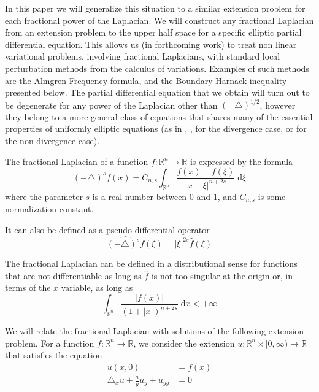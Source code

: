 \documentclass[letterpaper]{article}
\numberwithin{equation}{section}
\newcommand{\abs}[1]{\left\vert#1\right\vert}
\newcommand{\R}{\mathbb R}
\newcommand{\lap} {\triangle}
\newcommand{\dd} {\; \mathrm{d}}
\newcommand{\Ly}[1]{\lap_x #1 + \frac{a}{y} #1_y + #1_{yy}}
\begin{document}
In this paper we will generalize this situation to a similar extension problem for each fractional power of the Laplacian. We will construct any fractional Laplacian from an extension problem to the upper half space for a specific elliptic partial differential equation. This allows us (in forthcoming work) to treat non linear variational problems, involving fractional Laplacians, with standard local perturbation methods from the calculus of variations. Examples of such methods are the Almgren Frequency formula, and the Boundary Harnack inequality presented below. The partial differential equation that we obtain will turn out to be degenerate for any power of the Laplacian other than $(-\lap)^{1/2}$, however they belong to a more general class of equations that shares many of the essential properties of uniformly elliptic equations (as in \cite{FKS}, \cite{FJK}, \cite{FKJ} for the divergence case, or \cite{CG} for the non-divergence case). %

The fractional Laplacian of a function $f : \R^n \to \R$ is expressed by the formula
\begin{equation}
(-\lap)^s f(x) = C_{n,s} \int_{\R^n} \frac{f(x) - f(\xi)}{\abs{x-\xi}^{n+2s}} \dd \xi
\end{equation}
where the parameter $s$ is a real number between $0$ and $1$, and $C_{n,s}$ is some normalization constant.

It can also be defined as a pseudo-differential operator
\[ \widehat {(-\lap)^s f} (\xi) = \abs{\xi}^{2s} \widehat f(\xi) \]

The fractional Laplacian can be defined in a distributional sense for functions that are not differentiable as long as $\hat f$ is not too singular at the origin or, in terms of the $x$ variable, as long as
\[ \int_{\R^n} \frac{\abs{f(x)}}{(1+\abs{x})^{n+2s}} \dd x < + \infty \]

We will relate the fractional Laplacian with solutions of the following extension problem. For a function $f : \R^n \to \R$, we consider the extension $u : \R^n \times [0,\infty) \to \R$ that satisfies the equation
\begin{align}
u(x,0) &= f(x) \label{eq:dirichletboundary}\\
\Ly u &= 0 \label{eq:withy}
\end{align}
\end{document}
